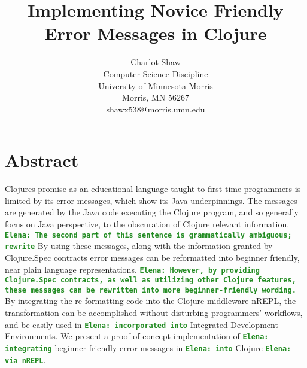 \documentclass[12pt]{article}
\newcommand{\comment}[1]{{\bf \tt  {#1}}}
\newcommand{\emcomment}[1]{\textcolor{ForestGreen}{\comment{Elena: {#1}}}}
\begin{document}
\pagestyle{plain}
%

\title{Implementing Novice Friendly Error Messages in Clojure}
%
%

\author{
Charlot Shaw \\
Computer Science Discipline \\
University of Minnesota Morris\\
Morris, MN 56267\\
shawx538@morris.umn.edu
}
\maketitle
\thispagestyle{empty}

\section*{\centering Abstract}
Clojures promise as an educational language taught to first time programmers is
limited by its error messages, which show its Java underpinnings. The messages
are generated by the Java code executing the Clojure program, and so generally
focus on Java perspective, to the obscuration of Clojure relevant information.
\emcomment{The second part of this sentence is grammatically ambiguous; rewrite}
By using these messages, along with the information granted by Clojure.Spec contracts
 error messages can be reformatted into beginner friendly, near plain language representations.
\emcomment{However, by providing Clojure.Spec contracts, as well as utilizing other Clojure features,  
these messages can be rewritten into more beginner-friendly wording.}
 By integrating the re-formatting code into the Clojure middleware nREPL, the
 transformation can be accomplished without disturbing programmers' workflows, and be easily
 used in \emcomment{incorporated into} Integrated Development Environments. 
We present a proof of concept implementation
 of \emcomment{integrating} beginner friendly error messages in \emcomment{into} Clojure
\emcomment{via nREPL}.
\end{document}
